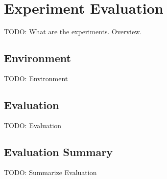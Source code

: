 \chapter{Experiment Evaluation}\label{cha:experiment}
TODO: What are the experiments. Overview.

\section{Environment} 
TODO: Environment

\section{Evaluation}
TODO: Evaluation

\section{Evaluation Summary} \label{sec:expSum}
TODO: Summarize Evaluation
